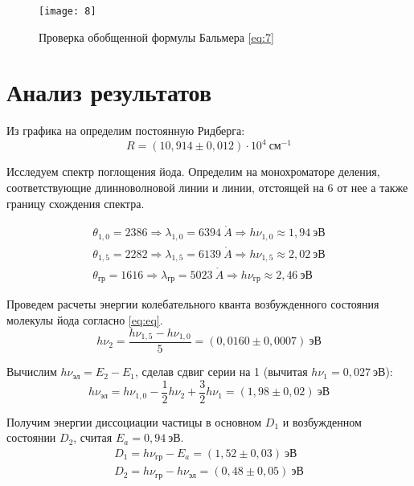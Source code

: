 \documentclass[a4paper, 12pt]{article}
\begin{document}
\begin{figure}[H]
    \texttt{[image: 8]} 
    \caption{Проверка обобщенной формулы Бальмера \eqref{eq:7}}
    \label{fig:8}
\end{figure}





\section{Анализ результатов}

Из графика на  определим постоянную Ридберга:
\[
    R = (10,914 \pm 0,012) \cdot 10^{4}\: \text{см}^{-1}
\]

Исследуем спектр поглощения йода. Определим на монохроматоре деления,
соответствующие длинноволновой линии и линии, отстоящей на 6 от нее а
также границу схождения спектра.

\begin{equation*}
    \begin{gathered}
        \theta_{1, 0} = 2386 \Rightarrow \lambda_{1, 0} = 6394\:
        \mathring{A} \Rightarrow h\nu _{1, 0} \approx 1,94 \:
        \text{эВ}\\
        \theta_{1, 5} = 2282 \Rightarrow \lambda_{1, 5} = 6139\:
        \mathring{A} \Rightarrow h\nu _{1, 5} \approx 2,02 \:
        \text{эВ}\\
        \theta_{\text{гр}} = 1616 \Rightarrow \lambda_{\text{гр}} =
        5023\:
        \mathring{A} \Rightarrow h\nu _{\text{гр}} \approx 2,46 \:
        \text{эВ}
    \end{gathered}
\end{equation*}

Проведем расчеты энергии колебательного кванта возбужденного состояния
молекулы йода согласно \eqref{eq:eq}.
\[
    h\nu_2 = \frac{h\nu_{1, 5} - h\nu_{1, 0}}{5} = (0,0160 \pm 0,0007) \: \text{эВ} 
\]

Вычислим $h\nu_\text{эл} = E_2 - E_1$, сделав сдвиг серии на 1
(вычитая $h\nu_1 = 0,027\: \text{эВ}$):
\[
    h\nu_\text{эл} = h\nu_{1, 0} - \frac{1}{2}h\nu_2 + \frac{3}{2}h
    \nu_1 = (1,98 \pm 0,02) \: \text{эВ} 
\]

Получим энергии диссоциации частицы в основном $D_1$ и возбужденном
состоянии $D_2$, считая $E_a = 0,94\: \text{эВ}$.
\begin{equation*}
    \begin{gathered}
        D_1 = h\nu_\text{гр} - E_a = (1,52 \pm 0,03)\: \text{эВ}\\
        D_2 = h\nu_\text{гр} - h\nu_\text{эл} = (0,48 \pm 0,05)\:
        \text{эВ}
    \end{gathered}
\end{equation*}
\end{document}
